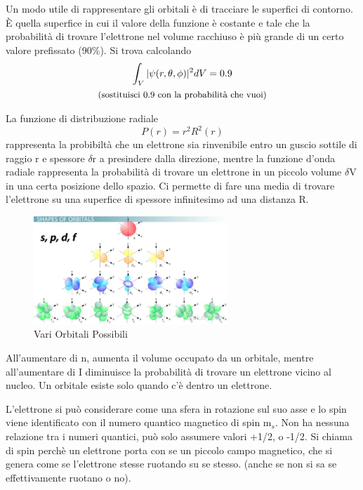 \documentclass[a4paper]{article}
\begin{document}
Un modo utile di rappresentare gli orbitali è di tracciare le superfici di contorno. È quella superfice in cui il valore della funzione è costante e tale che la probabilità di trovare l'elettrone nel volume racchiuso è più grande di un certo valore prefissato (90\%). Si trova calcolando 
\begin{gather*}
    \int_{V} |\psi(r,\theta,\phi)|^2dV = 0.9 \\
     \text{\small{(sostituisci 0.9 con la probabilità che vuoi)}}
\end{gather*}

La funzione di distribuzione radiale 
\begin{equation*}
    P(r)=r^2R^2(r)
\end{equation*}
rappresenta la probibiltà che un elettrone sia rinvenibile entro un guscio sottile di raggio r e spessore $\delta$r a presindere dalla direzione, mentre la funzione d'onda radiale rappresenta la probabilità di trovare un elettrone in un piccolo volume $\delta$V in una certa posizione dello spazio. Ci permette di fare una media di trovare l'elettrone su una superfice di spessore infinitesimo ad una distanza R. 
\begin{figure}[!h]
    \centering
    \includegraphics[width=0.65\textwidth]{orbitali.jpg}
    \caption{Vari Orbitali Possibili}
\end{figure}
\FloatBarrier

All'aumentare di n, aumenta il volume occupato da un orbitale, mentre all'aumentare di I diminuisce la probabilità di trovare un elettrone vicino al nucleo. Un orbitale esiste solo quando c'è dentro un elettrone. 

L'elettrone si può considerare come una sfera in rotazione sul suo asse e lo spin viene identificato con il numero quantico magnetico di spin m$_s$. Non ha nessuna relazione tra i numeri quantici, può solo assumere valori +1/2, o -1/2. Si chiama di spin perchè un elettrone porta con se un piccolo campo magnetico, che si genera come se l'elettrone stesse ruotando su se stesso. (anche se non si sa se effettivamente ruotano o no). 
\end{document}
